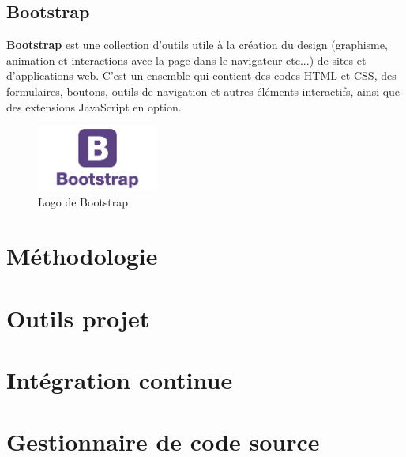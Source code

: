 \documentclass[12pt]{report}
\begin{document}
	  \subsection{Bootstrap}
	    \textbf{Bootstrap} est une collection d'outils utile à la création du design (graphisme, animation et interactions avec la page dans le navigateur etc...) de sites et d'applications web. C'est un ensemble qui contient des codes HTML et CSS, des formulaires, boutons, outils de navigation et autres éléments interactifs, ainsi que des extensions JavaScript en option.
	    
	    \begin{figure}[H]
	    \begin{center}
	      \includegraphics[scale=0.6, width=4cm]{images/logoBootstrap.png}
	      \caption{Logo de Bootstrap}
	    \end{center}
	  \end{figure}
	  
	  \section{Méthodologie}
	  \section{Outils projet}
	  \section{Intégration continue}
	  \section{Gestionnaire de code source}
	  
	  
  \newpage
\end{document}
